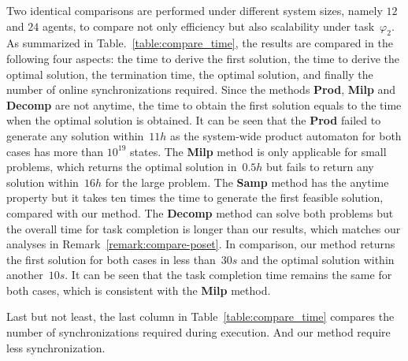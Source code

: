 Two identical comparisons are performed under different system sizes,
namely $12$ and $24$ agents, to compare not only efficiency but also scalability under task~$\varphi_2$.
As summarized in Table.~\ref{table:compare_time},
the results are compared in the following four aspects:
the time to derive the first solution,
the time to derive the optimal solution,
the termination time, the optimal solution,
and finally the number of online synchronizations required.
Since the methods \textbf{Prod}, \textbf{Milp} and \textbf{Decomp} are not
anytime, the time to obtain  the first solution equals to the time
when the optimal solution is obtained.
It can be seen that the \textbf{Prod} failed to generate any solution
within~$11h$ as the system-wide product automaton for both cases
has more than $10^{19}$ states.
The \textbf{Milp} method is only applicable for small problems,
which returns the optimal solution in~$0.5h$ but fails to
return any solution within~$16h$ for the large problem.
The \textbf{Samp} method has the anytime property but it takes ten times
the time to generate
the first feasible solution, compared with our method.
The \textbf{Decomp} method can solve both problems but the overall time
for task completion is longer than our results,
which matches our analyses in Remark~\ref{remark:compare-poset}.
In comparison, our method returns the first solution for both cases in less
than~$30s$ and the optimal solution within another~$10s$.
It can be seen that the task completion time remains the same for both cases,
which is consistent with the \textbf{Milp} method.

Last but not least, the last column in Table~\ref{table:compare_time} compares the number
of synchronizations required during execution. And our method require less synchronization.

